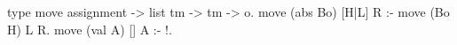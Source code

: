 \begin{elpicode}
  type move assignment -> list tm -> tm -> o.
  move (abs Bo) [H|L] R :- move (Bo H) L R.
  move (val A)  [] A :- !.

\end{elpicode}
